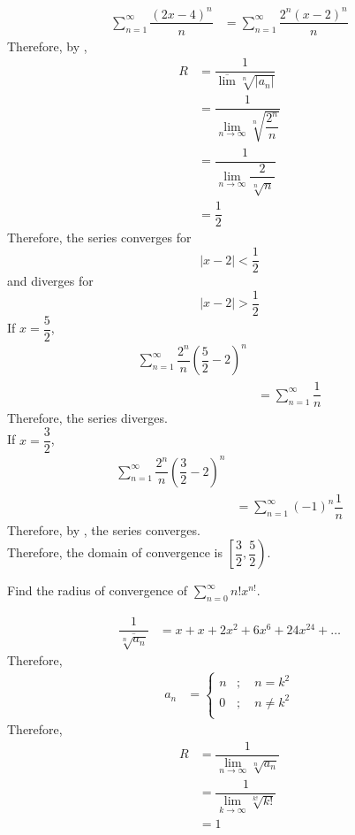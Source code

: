 \documentclass[fleqn, a4paper, 12pt, twoside]{article}
\theoremstyle{definition}
\theoremstyle{theorem}
\begin{document}
\begin{solution}
	\begin{align*}
		\sum_{n = 1}^{\infty} \dfrac{(2x - 4)^n}{n} &= \sum_{n = 1}^{\infty} \dfrac{2^n (x - 2)^n}{n}
	\end{align*}
	Therefore, by ,
	\begin{align*}
		R &= \dfrac{1}{\overline{\lim} \sqrt[n]{|a_n|}}\\
		&= \dfrac{1}{\lim\limits_{n \to \infty} \sqrt[n]{\dfrac{2^n}{n}}}\\
		&= \dfrac{1}{\lim\limits_{n \to \infty} \dfrac{2}{\sqrt[n]{n}}}\\
		&= \dfrac{1}{2}
	\end{align*}
	Therefore, the series converges for
	\begin{equation*}
		|x - 2| < \dfrac{1}{2}
	\end{equation*}
	and diverges for
	\begin{equation*}
		|x - 2| > \dfrac{1}{2}
	\end{equation*}
	If $x = \dfrac{5}{2}$, 
	\begin{align*}
		\sum_{n = 1}^{\infty} \dfrac{2^n}{n} \left( \dfrac{5}{2} - 2 \right)^n\\
		&= \sum_{n = 1}^{\infty} \dfrac{1}{n}
	\end{align*}
	Therefore, the series diverges.\\
	If $x = \dfrac{3}{2}$, 
	\begin{align*}
		\sum_{n = 1}^{\infty} \dfrac{2^n}{n} \left( \dfrac{3}{2} - 2 \right)^n\\
		&= \sum_{n = 1}^{\infty} (-1)^n \dfrac{1}{n}
	\end{align*}
	Therefore, by , the series converges.\\
	Therefore, the domain of convergence is $\left[ \dfrac{3}{2} , \dfrac{5}{2} \right)$.
\end{solution}

\begin{question}
	Find the radius of convergence of $\sum_{n = 0}^{\infty} n! x^{n!}$.
\end{question}

\begin{solution}
	\begin{align*}
		\dfrac{1}{\overline{\sqrt[n]{a_n}}} &= x + x + 2 x^2 + 6 x^6 + 24 x^{24} + \dots
	\end{align*}
	Therefore,
	\begin{align*}
		a_n &=
			\begin{cases}
				n &;\quad n = k^2\\
				0 &;\quad n \neq k^2\\
			\end{cases}
	\end{align*}
	Therefore, 
	\begin{align*}
		R &= \dfrac{1}{\lim\limits_{n \to \infty} \sqrt[n]{a_n}}\\
		&= \dfrac{1}{\lim\limits_{k \to \infty} \sqrt[k!]{k!}}\\
		&= 1
	\end{align*}
\end{solution}
\end{document}
